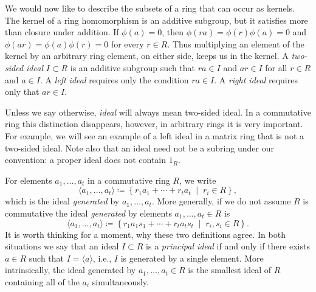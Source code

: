 \documentclass[Notebook.tex]{subfiles}
\begin{document}
\newpage

We would now like to describe the subsets of a ring that can occur as kernels. The kernel of a ring homomorphism is an additive subgroup, but it satisfies more than closure under addition. If $\phi(a)=0$, then $\phi(ra)=\phi(r)\phi(a)=0$ and $\phi(ar)=\phi(a)\phi(r)=0$ for every $r\in R$. Thus multiplying an element of the kernel by an arbitrary ring element, on either side, keeps us in the kernel. A \emph{two-sided ideal} $I\subset R$ is an additive subgroup such that $ra\in I$ and $ar\in I$ for all $r\in R$ and $a\in I$. A \emph{left ideal} requires only the condition $ra\in I$. A \emph{right ideal} requires only that $ar\in I$.

Unless we say otherwise, \emph{ideal} will always mean two-sided ideal. In a commutative ring this distinction disappears, however, in arbitrary rings it is very important. For example, we will see an example of a left ideal in a matrix ring that is not a two-sided ideal. Note also that an ideal need not be a subring under our convention: a proper ideal does not contain $1_R$.

For elements $a_1,\ldots,a_t$ in a commutative ring $R$, we write
\[
\langle a_1,\ldots,a_t\rangle \coloneqq \left\{r_1a_1+\cdots+r_ta_t \;\; \big| \;\; r_i\in R\right \},
\]
which is the ideal \emph{generated} by $a_1,\ldots,a_t$. More generally, if we do not assume $R$ is commutative the ideal \emph{generated} by elements $a_1,\ldots,a_t \in R$ is
\[
\langle a_1,\ldots,a_t\rangle \coloneqq \left\{r_1a_1s_1+\cdots+r_ta_ts_t \;\; \big| \;\; r_i,s_i\in R\right \}.
\]
It is worth thinking for a moment, why these two definitions agree. In both situations we say that an ideal $I \subset R$ is a \emph{principal ideal} if and only if there exists $a\in R$ such that $I = \langle a \rangle$, i.e., $I$ is generated by a single element. More intrinsically, the ideal generated by $a_1,\ldots,a_t \in R$ is the smallest ideal of $R$ containing all of the $a_i$ simultaneously.

\hrulefill
\end{document}
